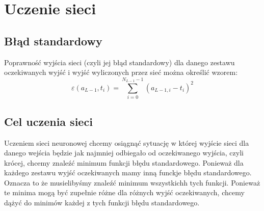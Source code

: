 \documentclass[]{article}
\begin{document}
\newpage
\section{Uczenie sieci}
	\subsection{Błąd standardowy}
		Poprawność wyjścia sieci (czyli jej błąd standardowy) dla danego zestawu oczekiwanych wyjść i wyjść wyliczonych przez sieć można określić wzorem:
		\begin{equation} \label{eq:standardlabel:1}
			\varepsilon \left( a_{L-1}, t_{i} \right) = \sum_{i=0}^ {N_{L-1}-1 } \left( a_{L-1,i} - t_{i} \right)^{2}
		\end{equation}
	
	\subsection{Cel uczenia sieci}
		Uczeniem sieci neuronowej chcemy osiągnąć sytuację w której wyjście sieci dla danego wejścia będzie jak najmniej odbiegało od oczekiwanego wyjścia, czyli krócej, chcemy znaleźć minimum funkcji błędu standardowego. Ponieważ dla każdego zestawu wyjść oczekiwanych mamy inną funckje błędu standardowego. Oznacza to że musielibyśmy znaleźć minimum wszystkichh tych funkcji. Ponieważ te minima mogą być zupełnie różne dla różnych wyjść oczekiwanych, chcemy dążyć do minimów każdej z tych funkcji błędu standardowego.
		
\end{document}
